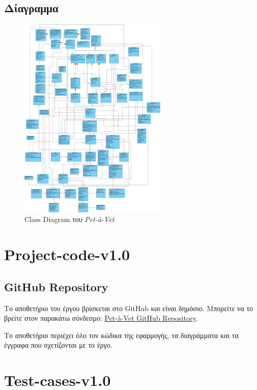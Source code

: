 \documentclass[12pt,a4paper,twoside]{book}
\begin{document}
\section{Δίαγραμμα}
\begin{figure}[H]
    \centering
    \includegraphics[width=0.63\textwidth]{Resources/Domain-model-v0.3.png}
    \caption{Class Diagram του \textit{Pet-à-Vet}}\label{fig:class-diagram}
\end{figure}

\chapter{Project-code-v1.0}

\section{GitHub Repository}

Το αποθετήριο του έργου βρίσκεται στο GitHub και είναι δημόσιο. Μπορείτε να το βρείτε στον παρακάτω σύνδεσμο: \href{https://github.com/IBilba/Pet-a-Vet}{Pet-à-Vet GitHub Repository}. %

Το αποθετήριο περιέχει όλο τον κώδικα της εφαρμογής, τα διαγράμματα και τα έγγραφα που σχετίζονται με το έργο. %

\chapter{Test-cases-v1.0}
\end{document}
